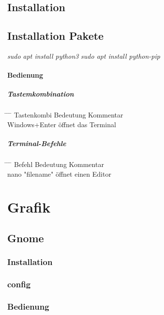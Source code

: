 \documentclass[10pt,a4paper,twoside]{book}
\begin{document}
\section{Installation}
\section{Installation Pakete}
\textit{sudo apt install python3}
\textit{sudo apt install python-pip}
\subsubsection{Bedienung}
\paragraph{Tastemkombination}
\begin{tabbing}
\hspace*{1mm} \=\hspace*{30mm} \=\hspace*{40mm} \= \kill
\> Tastenkombi \> Bedeutung \> Kommentar \\
\> Windows+Enter \> öffnet das Terminal
\end{tabbing}
\paragraph{Terminal-Befehle}
\begin{tabbing}
\hspace*{1mm} \=\hspace*{30mm} \=\hspace*{40mm} \= \kill
\> Befehl \> Bedeutung \> Kommentar \\
\> nano "filename" \> öffnet einen Editor
\end{tabbing}
\chapter{Grafik}
\section{Gnome}
\subsection{Installation}
\subsection{config}
\subsection{Bedienung}
\end{document}
